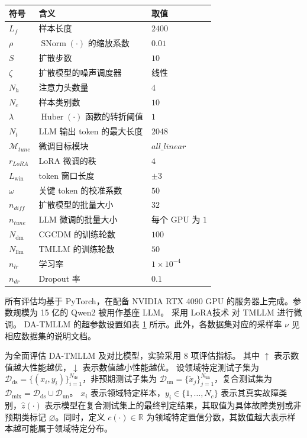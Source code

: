 \begin{table}[htbp]
  \centering
  \label{tab:Hyperparameter}
  \begin{tabular}{lll}
  \toprule
  符号 & 含义 & 取值 \\
  \midrule
  $L_{f}$ & 样本长度 & $2400$ \\
  $\rho$ & $\operatorname{SNorm}(\cdot)$ 的缩放系数 & $0.01$ \\
  $S$ & 扩散步数 & $10$ \\
  $\zeta$ & 扩散模型的噪声调度器 & 线性 \\
  $N_{h}$ & 注意力头数量 & $4$ \\
  $N_{c}$ & 样本类别数 & $10$ \\
  $\lambda$ & $\operatorname{Huber}(\cdot)$ 函数的转折阈值 & $1$ \\
  $N_{t}$ & LLM 输出 token 的最大长度 & $2048$ \\
  $\mathcal{M}_{tune}$ & 微调目标模块 & $all\_linear$ \\
  $r_{LoRA}$ & LoRA 微调的秩 & $4$ \\
  $L_{\mathrm{win}}$ & token 窗口长度 & $\pm 3$ \\
  $\omega$ & 关键 token 的校准系数 & $50$ \\
  $n_{diff}$ & 扩散模型的批量大小 & $32$ \\
  $n_{tune}$ & LLM 微调的批量大小 & 每个 GPU 为 $1$ \\
  ${N_\mathrm{dm}}$ & CGCDM 的训练轮数 & $100$ \\
  ${N_\mathrm{llm}}$ & TMLLM 的训练轮数 & $50$ \\
  ${n_{lr}}$ & 学习率 & $1 \times 10^{-4}$ \\
  ${n_{dr}}$ & Dropout 率 & $0.1$ \\
  \bottomrule
  \end{tabular}
\end{table}

所有评估均基于 PyTorch，在配备 NVIDIA RTX 4090 GPU 的服务器上完成。参数规模为 15 亿的 Qwen2 \cite{QWEN} 被用作基座 LLM。
采用 LoRA技术 \cite{20231213775448} 对 TMLLM 进行微调。
DA-TMLLM 的超参数设置如表 \ref{tab:Hyperparameter} 所示。此外，各数据集对应的采样率 $\nu$ 见相应数据集的说明文档。

为全面评估 DA-TMLLM 及对比模型，实验采用 8 项评估指标。
其中 $\uparrow$ 表示数值越大性能越优，$\downarrow$ 表示数值越小性能越优。
设领域特定测试子集为 $\mathcal{D}_{\mathrm{ds}}=\{(x_i,y_i)\}_{i=1}^{N_{\mathrm{ds}}}$，非预期测试子集为 $\mathcal{D}_{\mathrm{un}}=\{\tilde{x}_j\}_{j=1}^{N_{\mathrm{un}}}$，复合测试集为 $\mathcal{D}_{\mathrm{mix}}=\mathcal{D}_{\mathrm{ds}}\cup\mathcal{D}_{\mathrm{un}}$。
$x_i$ 表示领域特定样本，$y_i\in\{1,\dots,N_c\}$ 表示其真实故障类别，$\hat{z}(\cdot)$ 表示模型在复合测试集上的最终判定结果，其取值为具体故障类别或非预期类标记 $\varnothing$。同时，定义 $c(\cdot)\in\mathbb{R}$ 为领域特定置信分数，其数值越大表示样本越可能属于领域特定分布。

